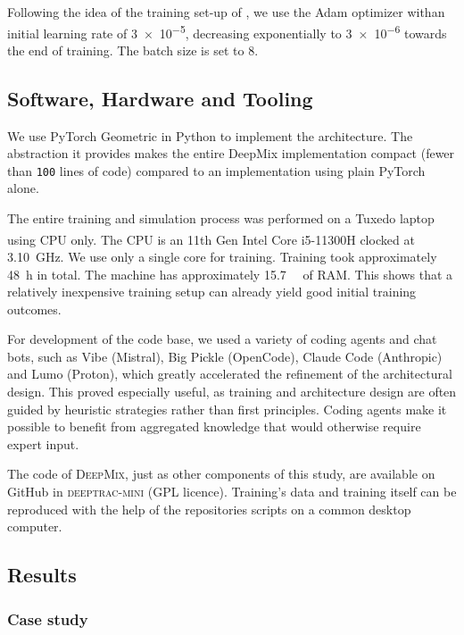 \documentclass[twocolumn, switch]{article} %
\begin{document}
Following the idea of the training set-up of \citet{Li2022}, we use the Adam optimizer withan initial learning rate of \num{3e-5}, decreasing exponentially to
\num{3e-6} towards the end of training. The batch size is set to 8.

\subsection{Software, Hardware and Tooling}

We use PyTorch Geometric in Python to implement the architecture. The
abstraction it provides makes the entire \textsc{}{DeepMix} implementation
compact (fewer than \texttt{100} lines of code) compared to an implementation using plain PyTorch alone.

The entire training and simulation process was performed on a Tuxedo laptop
using CPU only. The CPU is an 11th Gen Intel\textsuperscript{\textregistered}
Core\texttrademark{} i5-11300H clocked at \SI{3.10}{\giga\hertz}. We use only
a single core for training. Training took approximately \SI{48}{\hour} in
total. The machine has approximately \SI{15.7}{\giga\byte} of RAM. This shows
that a relatively inexpensive training setup can already yield good initial
training outcomes.

For development of the code base, we used a variety of coding agents and chat bots, such as Vibe (Mistral), Big Pickle (OpenCode), Claude Code (Anthropic) and Lumo (Proton), which greatly accelerated the refinement of the architectural design. This proved especially useful, as training and architecture design are often guided by
heuristic strategies rather than first principles. Coding agents make it
possible to benefit from aggregated knowledge that would otherwise require
expert input.

The code of \textsc{DeepMix}, just as other components of this study, are available on GitHub in \textsc{deeptrac-mini}  (GPL licence). Training's data and training itself can be reproduced with the help of the repositories scripts on a common desktop computer. 

\subsection{Results}

\subsubsection{Case study}
\end{document}
